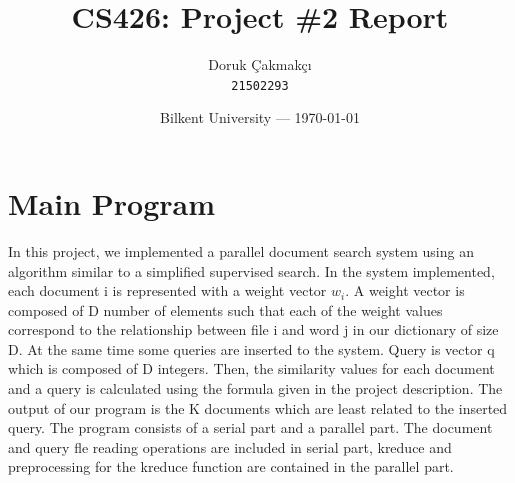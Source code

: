 \documentclass{article}
\title{CS426: Project \#2 Report} %
\author{Doruk Çakmakçı\\ \texttt{21502293}} %
\date{Bilkent University --- \today} %
\begin{document}
\maketitle %


\section{Main Program} %
\qquad In this project, we implemented a parallel document search system using an algorithm similar to a simplified supervised search. In the system implemented, each document i is represented with a weight vector $w_{i}$. A weight vector is composed of D number of elements such that each of the weight values correspond to the relationship between file i and word j in our dictionary of size D. At the same time some queries are inserted to the system. Query is vector q which is composed of D integers. Then, the similarity values for each document and a query is calculated using the formula given in the project description. The output of our program is the K documents which are least related to the inserted query. The program consists of a serial part and a parallel part. The document and query fle reading operations are included in serial part, kreduce and preprocessing for the kreduce function are contained in the parallel part. \\
\end{document}
